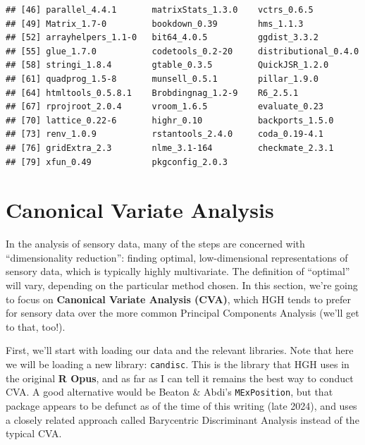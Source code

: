 \documentclass[
]{book}
\begin{document}
\begin{verbatim}
## [46] parallel_4.4.1       matrixStats_1.3.0    vctrs_0.6.5         
## [49] Matrix_1.7-0         bookdown_0.39        hms_1.1.3           
## [52] arrayhelpers_1.1-0   bit64_4.0.5          ggdist_3.3.2        
## [55] glue_1.7.0           codetools_0.2-20     distributional_0.4.0
## [58] stringi_1.8.4        gtable_0.3.5         QuickJSR_1.2.0      
## [61] quadprog_1.5-8       munsell_0.5.1        pillar_1.9.0        
## [64] htmltools_0.5.8.1    Brobdingnag_1.2-9    R6_2.5.1            
## [67] rprojroot_2.0.4      vroom_1.6.5          evaluate_0.23       
## [70] lattice_0.22-6       highr_0.10           backports_1.5.0     
## [73] renv_1.0.9           rstantools_2.4.0     coda_0.19-4.1       
## [76] gridExtra_2.3        nlme_3.1-164         checkmate_2.3.1     
## [79] xfun_0.49            pkgconfig_2.0.3
\end{verbatim}

\chapter{Canonical Variate Analysis}\label{canonical-variate-analysis}

In the analysis of sensory data, many of the steps are concerned with ``dimensionality reduction'': finding optimal, low-dimensional representations of sensory data, which is typically highly multivariate. The definition of ``optimal'' will vary, depending on the particular method chosen. In this section, we're going to focus on \textbf{Canonical Variate Analysis (CVA)}, which HGH tends to prefer for sensory data over the more common Principal Components Analysis (we'll get to that, too!).

First, we'll start with loading our data and the relevant libraries. Note that here we will be loading a new library: \texttt{candisc}. This is the library that HGH uses in the original \textbf{R Opus}, and as far as I can tell it remains the best way to conduct CVA. A good alternative would be Beaton \& Abdi's \texttt{MExPosition}, but that package appears to be defunct as of the time of this writing (late 2024), and uses a closely related approach called Barycentric Discriminant Analysis instead of the typical CVA.
\end{document}
